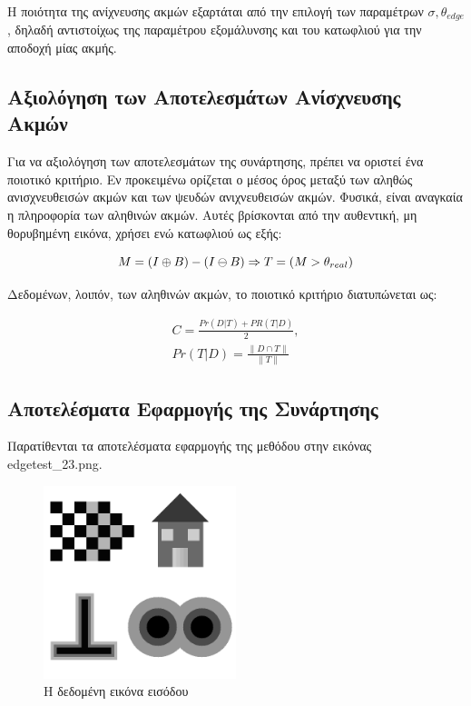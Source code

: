 \documentclass{article}
\newcommand{\eng}[1]{\foreignlanguage{english}{#1}}
\begin{document}
Η ποιότητα της ανίχνευσης ακμών εξαρτάται από την επιλογή των παραμέτρων $\sigma, \theta_{edge}$, δηλαδή αντιστοίχως της παραμέτρου εξομάλυνσης και του κατωφλιού για την αποδοχή μίας ακμής.

\subsection{Αξιολόγηση των Αποτελεσμάτων Ανίσχνευσης Ακμών}

Για να αξιολόγηση των αποτελεσμάτων της συνάρτησης, πρέπει να οριστεί ένα ποιοτικό κριτήριο. Εν προκειμένω ορίζεται ο μέσος όρος μεταξύ των αληθώς ανισχνευθεισών ακμών και των ψευδών ανιχνευθεισών ακμών. Φυσικά, είναι αναγκαία η πληροφορία των αληθινών ακμών. Αυτές βρίσκονται από την αυθεντική, μη θορυβημένη εικόνα, χρήσει ενώ κατωφλιού ως εξής:

\begin{equation}
    M = (I \oplus B) - (I \ominus B) \Rightarrow \\
    T = (M > \theta_{real})
\end{equation}

Δεδομένων, λοιπόν, των αληθινών ακμών, το ποιοτικό κριτήριο διατυπώνεται ως:

\begin{equation}
    \begin{gathered}
        C = \frac{Pr(D|T) + PR(T|D)}{2}, \\
        Pr(T|D) = \frac{\lVert D \cap T \rVert}{\lVert T \rVert}
    \end{gathered}
\end{equation}

\subsection{Αποτελέσματα Εφαρμογής της Συνάρτησης}

Παρατίθενται τα αποτελέσματα εφαρμογής της μεθόδου στην εικόνας \eng{edgetest\_23.png}.

\begin{figure}[h]
    \centering
    \includegraphics[width=0.5\textwidth]{../image-plots/edgetest_23.png}
    \caption{Η δεδομένη εικόνα εισόδου}
    \label{fig:edge-test}
\end{figure}
\end{document}
